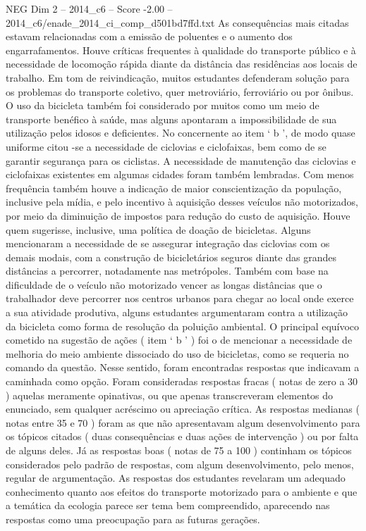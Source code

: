 \begin{textsample}{NEG Dim 2 – 2014\_c6 – Score -2.00 – 2014\_c6/enade\_2014\_ci\_comp\_d501bd7ffd.txt}
As consequências mais citadas estavam relacionadas com a emissão de poluentes e o aumento dos engarrafamentos.
Houve críticas frequentes à qualidade do transporte público e à necessidade de locomoção rápida diante da distância das residências aos locais de trabalho.
Em tom de reivindicação, muitos estudantes defenderam solução para os problemas do transporte coletivo, quer metroviário, ferroviário ou por ônibus.
O uso da bicicleta também foi considerado por muitos como um meio de transporte benéfico à saúde, mas alguns apontaram a impossibilidade de sua utilização pelos idosos e deficientes.
No concernente ao item ‘ b ’, de modo quase uniforme citou -se a necessidade de ciclovias e ciclofaixas, bem como de se garantir segurança para os ciclistas.
A necessidade de manutenção das ciclovias e ciclofaixas existentes em algumas cidades foram também lembradas.
Com menos frequência também houve a indicação de maior conscientização da população, inclusive pela mídia, e pelo incentivo à aquisição desses veículos não motorizados, por meio da diminuição de impostos para redução do custo de aquisição.
Houve quem sugerisse, inclusive, uma política de doação de bicicletas.
Alguns mencionaram a necessidade de se assegurar integração das ciclovias com os demais modais, com a construção de bicicletários seguros diante das grandes distâncias a percorrer, notadamente nas metrópoles.
Também com base na dificuldade de o veículo não motorizado vencer as longas distâncias que o trabalhador deve percorrer nos centros urbanos para chegar ao local onde exerce a sua atividade produtiva, alguns estudantes argumentaram contra a utilização da bicicleta como forma de resolução da poluição ambiental.
O principal equívoco cometido na sugestão de ações ( item ‘ b ’ ) foi o de mencionar a necessidade de melhoria do meio ambiente dissociado do uso de bicicletas, como se requeria no comando da questão.
Nesse sentido, foram encontradas respostas que indicavam a caminhada como opção.
Foram consideradas respostas fracas ( notas de zero a 30 ) aquelas meramente opinativas, ou que apenas transcreveram elementos do enunciado, sem qualquer acréscimo ou apreciação crítica.
As respostas medianas ( notas entre 35 e 70 ) foram as que não apresentavam algum desenvolvimento para os tópicos citados ( duas consequências e duas ações de intervenção ) ou por falta de alguns deles.
Já as respostas boas ( notas de 75 a 100 ) continham os tópicos considerados pelo padrão de respostas, com algum desenvolvimento, pelo menos, regular de argumentação.
As respostas dos estudantes revelaram um adequado conhecimento quanto aos efeitos do transporte motorizado para o ambiente e que a temática da ecologia parece ser tema bem compreendido, aparecendo nas respostas como uma preocupação para as futuras gerações.

\end{textsample}
